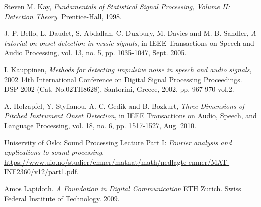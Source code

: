 \documentclass[10pt]{article}
\begin{document}
\begin{thebibliography}{9}

Steven M. Kay, \textit{Fundamentals of Statistical Signal Processing, Volume II: Detection Theory}. Prentice-Hall, 1998.

J. P. Bello, L. Daudet, S. Abdallah, C. Duxbury, M. Davies and M. B. Sandler, \textit{A tutorial on onset detection in music signals}, in IEEE Transactions on Speech and Audio Processing, vol. 13, no. 5, pp. 1035-1047, Sept. 2005.

I. Kauppinen, \textit{Methods for detecting impulsive noise in speech and audio signals}, 2002 14th International Conference on Digital Signal Processing Proceedings. DSP 2002 (Cat. No.02TH8628), Santorini, Greece, 2002, pp. 967-970 vol.2.

A. Holzapfel, Y. Stylianou, A. C. Gedik and B. Bozkurt, \textit{Three Dimensions of Pitched Instrument Onset Detection}, in IEEE Transactions on Audio, Speech, and Language Processing, vol. 18, no. 6, pp. 1517-1527, Aug. 2010.

Uniservity of Oslo: Sound Processing Lecture Part I: \textit{Fourier analysis and applications to sound processing}. \url{https://www.uio.no/studier/emner/matnat/math/nedlagte-emner/MAT-INF2360/v12/part1.pdf}.

Amos Lapidoth. \textit{A Foundation in Digital Communication} ETH Zurich. Swiss Federal Institute of Technology. 2009.


\end{thebibliography}
\end{document}
